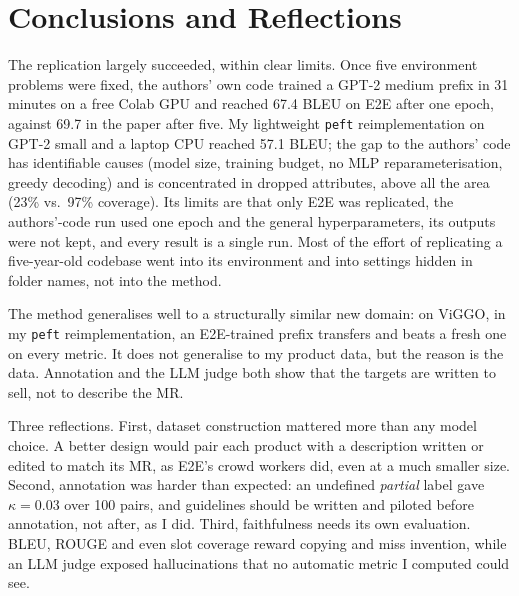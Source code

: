 \documentclass[11pt]{article}
\begin{document}
\section{Conclusions and Reflections}
The replication largely succeeded, within clear limits. Once five environment problems were fixed, the authors' own code trained a GPT-2 medium prefix in 31 minutes on a free Colab GPU and reached 67.4 BLEU on E2E after one epoch, against 69.7 in the paper after five. My lightweight \texttt{peft} reimplementation on GPT-2 small and a laptop CPU reached 57.1 BLEU; the gap to the authors' code has identifiable causes (model size, training budget, no MLP reparameterisation, greedy decoding) and is concentrated in dropped attributes, above all the area (23\% vs.\ 97\% coverage). Its limits are that only E2E was replicated, the authors'-code run used one epoch and the general hyperparameters, its outputs were not kept, and every result is a single run. Most of the effort of replicating a five-year-old codebase went into its environment and into settings hidden in folder names, not into the method.

The method generalises well to a structurally similar new domain: on ViGGO, in my \texttt{peft} reimplementation, an E2E-trained prefix transfers and beats a fresh one on every metric. It does not generalise to my product data, but the reason is the data. Annotation and the LLM judge both show that the targets are written to sell, not to describe the MR.

Three reflections. First, dataset construction mattered more than any model choice. A better design would pair each product with a description written or edited to match its MR, as E2E's crowd workers did, even at a much smaller size. Second, annotation was harder than expected: an undefined \emph{partial} label gave $\kappa = 0.03$ over 100 pairs, and guidelines should be written and piloted before annotation, not after, as I did. Third, faithfulness needs its own evaluation. BLEU, ROUGE and even slot coverage reward copying and miss invention, while an LLM judge exposed hallucinations that no automatic metric I computed could see.
\end{document}
